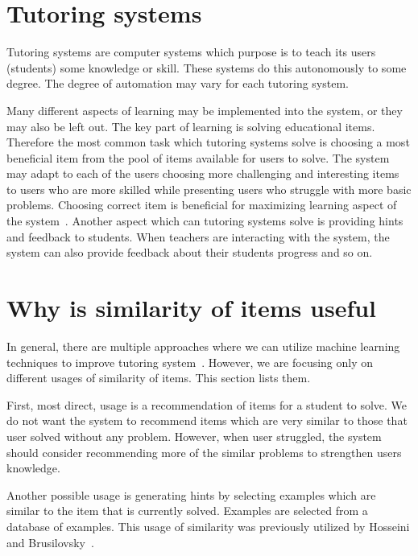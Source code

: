 \documentclass[
  printed, %
  table,   %
  nolof,     %
  nolot,     %
  color,
  final,
  nocover
]{fithesis3}
\begin{document}

\section{Tutoring systems}\label{tutoring-systems}

Tutoring systems are computer systems which purpose is to teach its users (students) some knowledge or skill. These systems do this autonomously to some degree. The degree of automation may vary for each tutoring system.


Many different aspects of learning may be implemented into the system, or they may also be left out. The key part of learning is solving educational items. Therefore the most common task which tutoring systems solve is choosing a most beneficial item from the pool of items available for users to solve. The system may adapt to each of the users choosing more challenging and interesting items to users who are more skilled while presenting users who struggle with more basic problems. Choosing correct item is beneficial for maximizing learning aspect of the system~\cite{papouvsek2015impact}. Another aspect which can tutoring systems solve is providing hints and feedback to students. When teachers are interacting with the system, the system can also provide feedback about their students progress and so on.


\section{Why is similarity of items useful}\label{why-is-similarity-of-items-useful}


In general, there are multiple approaches where we can utilize machine learning techniques to improve tutoring system~\cite{baker2010data}. However, we are focusing only on different usages of similarity of items. This section lists them.

First, most direct, usage is a recommendation of items for a student to solve. We do not want the system to recommend items which are very similar to those that user solved without any problem. However, when user struggled, the system should consider recommending more of the similar problems to strengthen users knowledge.

Another possible usage is generating hints by selecting examples which are similar to the item that is currently solved. Examples are selected from a database of examples. This usage of similarity was previously utilized by Hosseini and Brusilovsky~\cite{hosseini2017study}.
\end{document}
